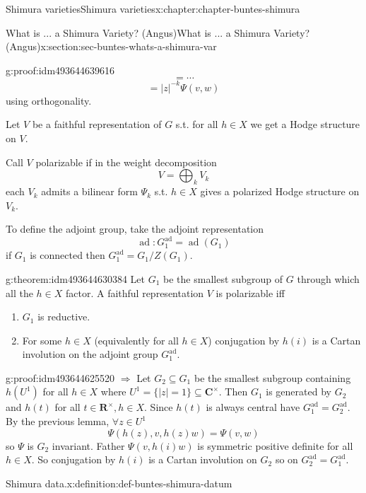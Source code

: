 \documentclass[oneside,10pt,]{book}
\numberwithin{equation}{section}
\newcommand{\RR}{\mathbf{R}}
\newcommand{\CC}{\mathbf{C}}
\DeclareMathOperator{\ad}{ad}
\begin{document}
\begin{chapterptx}{Shimura varieties}{}{Shimura varieties}{}{}{x:chapter:chapter-buntes-shimura}
\begin{sectionptx}{What is ... a Shimura Variety? (Angus)}{}{What is ... a Shimura Variety? (Angus)}{}{}{x:section:sec-buntes-whats-a-shimura-var}
\begin{proofptx}{}{g:proof:idm493644639616}
\begin{equation*}
= \cdots
\end{equation*}
%
\begin{equation*}
= |z|^{-k} \Psi(v,w)
\end{equation*}
using orthogonality.%
\end{proofptx}
Let \(V \) be a faithful representation of \(G \) s.t. for all \(h\in X\) we get  a Hodge structure on \(V\).%
\par
Call \(V\) polarizable if in the weight decomposition%
\begin{equation*}
V = \bigoplus_k V_k
\end{equation*}
each \(V_k\) admits a bilinear form \(\Psi_k\) s.t. \(h \in X\) gives a polarized Hodge structure on \(V_k\).%
\par
To define the adjoint group, take the adjoint representation%
\begin{equation*}
\ad \colon G_1^{\ad} = \ad(G_1)
\end{equation*}
if \(G_1\) is connected then \(G_1^{\ad} = G_1 /Z(G_1)\).%
\begin{theorem}{}{}{g:theorem:idm493644630384}%
Let \(G_1\) be the smallest subgroup of \(G\) through  which all the \(h \in X\) factor. A faithful representation \(V\) is polarizable iff%
\begin{enumerate}
\item{}\(G_1\) is reductive.%
\item{}For some \(h \in X\) (equivalently for all \(h \in X\)) conjugation by \(h(i)\) is a Cartan involution on the adjoint group \(G_1^{\ad}\).%
\end{enumerate}
%
\end{theorem}
\begin{proofptx}{}{g:proof:idm493644625520}
\(\Rightarrow\) Let \(G_2 \subseteq G_1\) be the smallest subgroup containing \(h(U^1)\) for all \(h \in X\) where \(U^1 = \{|z| = 1\} \subseteq \CC^\times\). Then \(G_1\) is generated by \(G_2\) and \(h(t)\) for all \(t \in \RR^\times, h \in X\). Since \(h(t)\) is always central have \(G_1^{\ad}=  G_2^{\ad}\). By the previous lemma, \(\forall z  \in U^1\)%
\begin{equation*}
\Psi(h(z), v, h(z) w) = \Psi(v,w)
\end{equation*}
so \(\Psi\) is \(G_2\) invariant. Father \(\Psi(v, h(i) w)\) is symmetric positive definite for all \(h \in X\). So conjugation by \(h(i)\) is a Cartan involution on \(G_2\) so on \(G_2^{\ad} = G_1^{\ad}\).%
\end{proofptx}
\begin{definition}{Shimura data.}{x:definition:def-buntes-shimura-datum}%

\end{definition}
\end{sectionptx}
\end{chapterptx}
\end{document}
